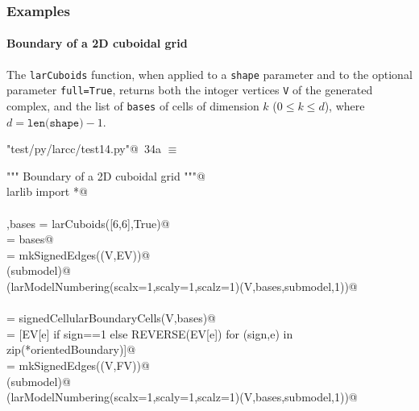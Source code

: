 \documentclass[11pt,oneside]{article}    %
\begin{document}
\subsubsection{Examples}

\paragraph{Boundary of a 2D cuboidal grid}
The \texttt{larCuboids} function, when applied to a \texttt{shape} parameter and to the optional parameter \texttt{full=True}, returns both the intoger vertices \texttt{V} of the generated complex, and the list of \texttt{bases} of cells of dimension $k$ ($0\leq k\leq d$), where $d = \texttt{len(shape)}-1$.

\begin{flushleft} \small \label{scrap55}
\protect{}\verb@"test/py/larcc/test14.py"@\nobreak\ {\footnotesize 34a }$\equiv$
\vspace{-1ex}
\begin{list}{}{} \item
\mbox{}\verb@""" Boundary of a 2D cuboidal grid """@\\
\mbox{}\verb@from larlib import *@\\
\mbox{}\verb@@\\
\mbox{}\verb@V,bases = larCuboids([6,6],True)@\\
\mbox{}\verb@[VV,EV,FV] = bases@\\
\mbox{}\verb@submodel = mkSignedEdges((V,EV))@\\
\mbox{}\verb@VIEW(submodel)@\\
\mbox{}\verb@VIEW(larModelNumbering(scalx=1,scaly=1,scalz=1)(V,bases,submodel,1))@\\
\mbox{}\verb@@\\
\mbox{}\verb@orientedBoundary = signedCellularBoundaryCells(V,bases)@\\
\mbox{}\verb@FV = [EV[e] if sign==1 else REVERSE(EV[e])  for (sign,e) in zip(*orientedBoundary)]@\\
\mbox{}\verb@submodel = mkSignedEdges((V,FV))@\\
\mbox{}\verb@VIEW(submodel)@\\
\mbox{}\verb@VIEW(larModelNumbering(scalx=1,scaly=1,scalz=1)(V,bases,submodel,1))@\\
\mbox{}\verb@@{\NWsep}
\end{list}
\vspace{-2ex}
\end{flushleft}
\end{document}
